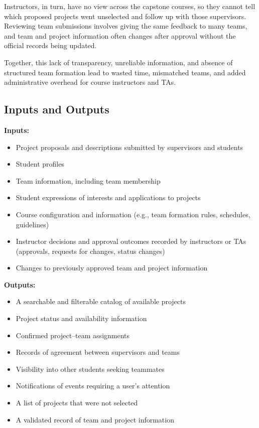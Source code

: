 \documentclass{article}
\begin{document}
Instructors, in turn, have no view across the capstone courses, so they cannot
tell which proposed projects went unselected and follow up with those
supervisors. Reviewing team submissions involves giving the same feedback to
many teams, and team and project information often changes after approval
without the official records being updated.

Together, this lack of transparency, unreliable information, and absence of
structured team formation lead to wasted time, mismatched teams, and added
administrative overhead for course instructors and TAs.

\subsection{Inputs and Outputs}


\textbf{Inputs:}
\begin{itemize}
    \item Project proposals and descriptions submitted by supervisors and students
    \item Student profiles
    \item Team information, including team membership
    \item Student expressions of interests and applications to projects
    \item Course configuration and information (e.g., team formation rules, schedules, guidelines)
    \item Instructor decisions and approval outcomes recorded by instructors or TAs (approvals,
          requests for changes, status changes)
    \item Changes to previously approved team and project information
\end{itemize}

\textbf{Outputs:}
\begin{itemize}
    \item A searchable and filterable catalog of available projects
    \item Project status and availability information
    \item Confirmed project--team assignments
    \item Records of agreement between supervisors and teams
    \item Visibility into other students seeking teammates
    \item Notifications of events requiring a user's attention
    \item A list of projects that were not selected
    \item A validated record of team and project information
\end{itemize}
\end{document}
